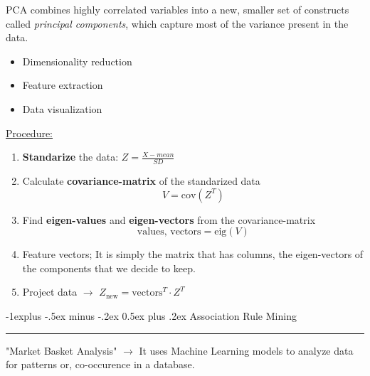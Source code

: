 \documentclass[letterpaper, 10.5pt,landscape]{article}
\makeatletter
\renewcommand{\subsection}{\@startsection{subsection}{2}{0mm}%
                                {-1explus -.5ex minus -.2ex}%
                                {0.5ex plus .2ex}%
                                {\normalfont\normalsize\bfseries}}
\makeatother
\begin{document}
\begin{multicols*}{3}
PCA combines highly correlated variables into a new, smaller set of constructs called \textit{ principal components}, which capture most of the variance present in the data.
\begin{itemize}
\vspace{-2pt}
    \item Dimensionality reduction
    \vspace{-2pt}
    \item Feature extraction
    \vspace{-2pt}
    \item Data visualization
    \vspace{-2pt}
\end{itemize}

\underline{Procedure:}
\begin{enumerate}
    \item\textbf{ Standarize} the data: \(\boxed{Z = \frac{X-mean}{SD} } \)
    \vspace{-2pt}
    \item Calculate \textbf{covariance-matrix} of the standarized data 
    \vspace{-2pt}
    \[\boxed{V = \text{cov}(Z^{T})} \]
    \vspace{-2pt}
    \item Find \textbf{eigen-values} and \textbf{eigen-vectors} from the covariance-matrix 
    \vspace{-2pt}
    \[\boxed{\text{values}, \, \text{vectors} = \text{eig}(V)}\]
    \vspace{-2pt}
    \item Feature vectors;  It is simply the matrix that has columns, the eigen-vectors of the components that we decide to keep.
    \vspace{-2pt}
    \item Project data $\rightarrow$ \(\boxed{Z_{\text{new}} = \text{vectors}^{T} \cdot Z^{T}}\)
    \vspace{-2pt}
\end{enumerate}






\subsection{Association Rule Mining} {\color{teal}\hrule height 0.5pt} \smallskip

"Market Basket Analysis" $\rightarrow$ It uses Machine Learning models to analyze data for patterns or, co-occurence in a database.



\end{multicols*}
\end{document}

